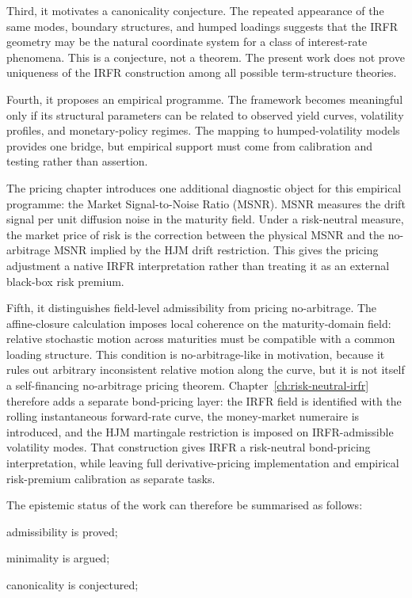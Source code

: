 \documentclass[11pt,oneside]{book}
\begin{document}
Third, it motivates a canonicality conjecture. The repeated appearance
of the same modes, boundary structures, and humped loadings suggests
that the IRFR geometry may be the natural coordinate system for a class
of interest-rate phenomena. This is a conjecture, not a theorem. The
present work does not prove uniqueness of the IRFR construction among
all possible term-structure theories.

Fourth, it proposes an empirical programme. The framework becomes
meaningful only if its structural parameters can be related to observed
yield curves, volatility profiles, and monetary-policy regimes. The
mapping to humped-volatility models provides one bridge, but empirical
support must come from calibration and testing rather than assertion.

The pricing chapter introduces one additional diagnostic object for this empirical programme: the Market Signal-to-Noise Ratio (MSNR). MSNR measures the drift signal per unit diffusion noise in the maturity field. Under a risk-neutral measure, the market price of risk is the correction between the physical MSNR and the no-arbitrage MSNR implied by the HJM drift restriction. This gives the pricing adjustment a native IRFR interpretation rather than treating it as an external black-box risk premium.

Fifth, it distinguishes field-level admissibility from pricing
no-arbitrage. The affine-closure calculation imposes local coherence on
the maturity-domain field: relative stochastic motion across maturities
must be compatible with a common loading structure. This condition is
no-arbitrage-like in motivation, because it rules out arbitrary
inconsistent relative motion along the curve, but it is not itself a
self-financing no-arbitrage pricing theorem. Chapter~\ref{ch:risk-neutral-irfr}
therefore adds a separate bond-pricing layer: the IRFR field is
identified with the rolling instantaneous forward-rate curve, the
money-market numeraire is introduced, and the HJM martingale restriction
is imposed on IRFR-admissible volatility modes. That construction gives
IRFR a risk-neutral bond-pricing interpretation, while leaving full
derivative-pricing implementation and empirical risk-premium calibration
as separate tasks.

The epistemic status of the work can therefore be summarised as follows:

admissibility is proved;

minimality is argued;

canonicality is conjectured;
\end{document}
